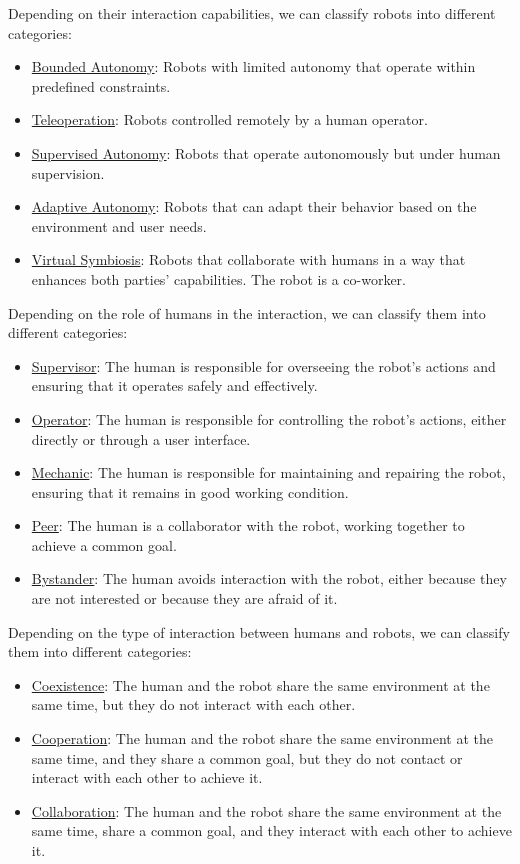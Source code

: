 Depending on their interaction capabilities, we can classify robots into different categories:
\begin{itemize}
    \item \ul{Bounded Autonomy}: Robots with limited autonomy that operate within predefined constraints.
    \item \ul{Teleoperation}: Robots controlled remotely by a human operator.
    \item \ul{Supervised Autonomy}: Robots that operate autonomously but under human supervision.
    \item \ul{Adaptive Autonomy}: Robots that can adapt their behavior based on the environment and user needs.
    \item \ul{Virtual Symbiosis}: Robots that collaborate with humans in a way that enhances both parties' capabilities. The robot is a co-worker.
\end{itemize}

Depending on the role of humans in the interaction, we can classify them into different categories:
\begin{itemize}
    \item \ul{Supervisor}: The human is responsible for overseeing the robot's actions and ensuring that it operates safely and effectively.
    \item \ul{Operator}: The human is responsible for controlling the robot's actions, either directly or through a user interface.
    \item \ul{Mechanic}: The human is responsible for maintaining and repairing the robot, ensuring that it remains in good working condition.
    \item \ul{Peer}: The human is a collaborator with the robot, working together to achieve a common goal.
    \item \ul{Bystander}: The human avoids interaction with the robot, either because they are not interested or because they are afraid of it.
\end{itemize}

Depending on the type of interaction between humans and robots, we can classify them into different categories:
\begin{itemize}
    \item \ul{Coexistence}: The human and the robot share the same environment at the same time, but they do not interact with each other.
    \item \ul{Cooperation}: The human and the robot share the same environment at the same time, and they share a common goal, but they do not contact or interact with each other to achieve it.
    \item \ul{Collaboration}: The human and the robot share the same environment at the same time, share a common goal, and they interact with each other to achieve it.
\end{itemize}

